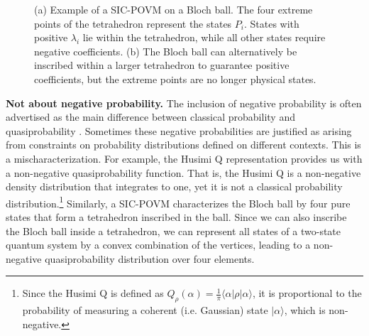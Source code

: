 \documentclass[10pt,twocolumn, nofootinbib]{revtex4-2}
\begin{document}
\begin{figure}[H]
\begin{subfigure}[c]{0.23\textwidth}
		\caption{}
	\end{subfigure}
	\caption{(a) Example of a SIC-POVM on a Bloch ball. The four extreme points of the tetrahedron represent the states $P_i$. States with positive $\lambda_i$ lie within the tetrahedron, while all other states require negative coefficients. (b) The Bloch ball can alternatively be inscribed within a larger tetrahedron to guarantee positive coefficients, but the extreme points are no longer physical states.}\label{SIC}
\end{figure}


\textbf{Not about negative probability.} The inclusion of negative probability is often advertised as the main difference between classical probability and quasiprobability \cite{ferrie2010,adhikary2020}. Sometimes these negative probabilities are justified as arising from constraints on probability distributions defined on different contexts. This is a mischaracterization. For example, the Husimi Q representation provides us with a non-negative quasiprobability function. That is, the Husimi Q is a non-negative density distribution that integrates to one, yet it is not a classical probability distribution.\footnote{Since the Husimi Q is defined as $Q_{\rho} ( \alpha ) = \frac{1}{\pi} \langle \alpha | \rho | \alpha \rangle$, it is proportional to the probability of measuring a coherent (i.e. Gaussian) state $| \alpha \rangle$, which is non-negative. } Similarly, a SIC-POVM characterizes the Bloch ball by four pure states that form a tetrahedron inscribed in the ball. Since we can also inscribe the Bloch ball inside a tetrahedron, we can represent all states of a two-state quantum system by a convex combination of the vertices, leading to a non-negative quasiprobability distribution over four elements.
\end{document}
